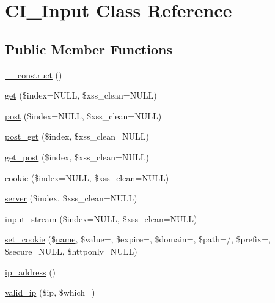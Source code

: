 \hypertarget{class_c_i___input}{}\section{C\+I\+\_\+\+Input Class Reference}
\label{class_c_i___input}
\subsection*{Public Member Functions}
\begin{DoxyCompactItemize}
\item 
\mbox{\hyperlink{class_c_i___input_a095c5d389db211932136b53f25f39685}{\+\_\+\+\_\+construct}} ()
\item 
\mbox{\hyperlink{class_c_i___input_a970536cd64a3d4457502140cce03fb05}{get}} (\$index=N\+U\+LL, \$xss\+\_\+clean=N\+U\+LL)
\item 
\mbox{\hyperlink{class_c_i___input_abe57ddea9c16f0d9194c82c700c0416f}{post}} (\$index=N\+U\+LL, \$xss\+\_\+clean=N\+U\+LL)
\item 
\mbox{\hyperlink{class_c_i___input_a3c554376c4a437c5363a143d1ca88ecc}{post\+\_\+get}} (\$index, \$xss\+\_\+clean=N\+U\+LL)
\item 
\mbox{\hyperlink{class_c_i___input_aaf7eba2dc5fda4e14ae063f66236821f}{get\+\_\+post}} (\$index, \$xss\+\_\+clean=N\+U\+LL)
\item 
\mbox{\hyperlink{class_c_i___input_a473ce915ac81faa466ca351dacae799d}{cookie}} (\$index=N\+U\+LL, \$xss\+\_\+clean=N\+U\+LL)
\item 
\mbox{\hyperlink{class_c_i___input_aab98211ca0db00061e8eb8b928f4fd90}{server}} (\$index, \$xss\+\_\+clean=N\+U\+LL)
\item 
\mbox{\hyperlink{class_c_i___input_a55235beafbbc257c5e511435a4d9ec81}{input\+\_\+stream}} (\$index=N\+U\+LL, \$xss\+\_\+clean=N\+U\+LL)
\item 
\mbox{\hyperlink{class_c_i___input_aa3601d205cabc35a3d1f56ed90024eda}{set\+\_\+cookie}} (\$\mbox{\hyperlink{waiter_2order_8php_afb270cde4944e425a37cf277116a7f43}{name}}, \$value=\textquotesingle{}\textquotesingle{}, \$expire=\textquotesingle{}\textquotesingle{}, \$domain=\textquotesingle{}\textquotesingle{}, \$path=\textquotesingle{}/\textquotesingle{}, \$prefix=\textquotesingle{}\textquotesingle{}, \$secure=N\+U\+LL, \$httponly=N\+U\+LL)
\item 
\mbox{\hyperlink{class_c_i___input_aec2f772317b4fb79cc696412c2e455c3}{ip\+\_\+address}} ()
\item 
\mbox{\hyperlink{class_c_i___input_a10da42e1fde6cd5b335efcd2338c4ff8}{valid\+\_\+ip}} (\$ip, \$which=\textquotesingle{}\textquotesingle{})

\end{DoxyCompactItemize}
